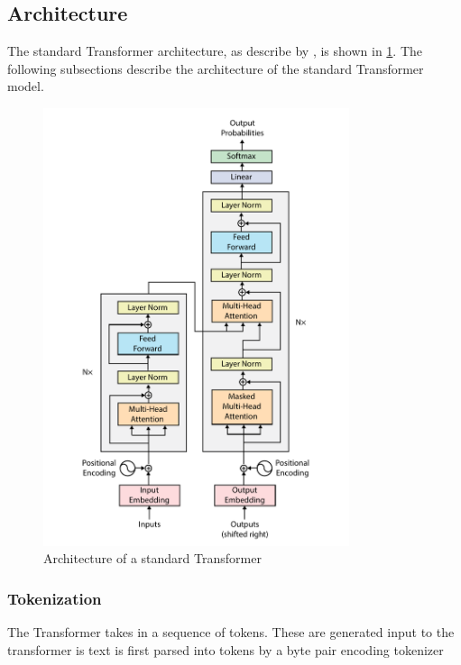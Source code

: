 \subsection{Architecture}
\label{sec:transformer-architecture}
The standard Transformer architecture, as describe by \citeyear{vaswani2017attention}, is shown in \cref{fig:transformer-architecture}. The following subsections describe the architecture of the standard Transformer model.

\begin{figure}[htp]
    \centering
    \includegraphics[width=0.8\textwidth]{figures/transformer_architecture.pdf}
    \caption{Architecture of a standard Transformer \textcite{vaswani2017attention}}
    \label{fig:transformer-architecture}
\end{figure}


\subsubsection{Tokenization}
\label{sec:tokenization}
The Transformer takes in a sequence of tokens. These are generated input to the  transformer is text is first parsed into tokens by a byte pair encoding tokenizer

